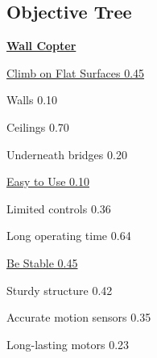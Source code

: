 \documentclass[12pt]{article}
\begin{document}
        \subsection{Objective Tree}
            \centerline{\Large \underline{\textbf{Wall Copter}}}
            \begin{multicols}{3}
                \noindent\underline{Climb on Flat Surfaces 0.45}
                
                \noindent Walls 0.10
                
                \noindent Ceilings 0.70
                
                \noindent Underneath bridges 0.20

                \columnbreak

                \noindent\underline{Easy to Use 0.10}

                \noindent Limited controls 0.36

                \noindent Long operating time 0.64

                \columnbreak
                
                \noindent\underline{Be Stable 0.45}
                
                \noindent Sturdy structure 0.42
                
                \noindent Accurate motion sensors 0.35
                
                \noindent Long-lasting motors 0.23

            \end{multicols}
    
    \newpage
\end{document}
